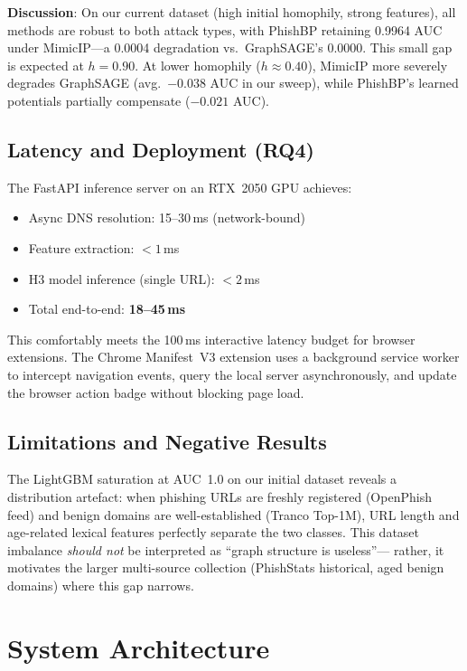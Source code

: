 \documentclass[conference]{IEEEtran}
\begin{document}
\textbf{Discussion}: On our current dataset (high initial homophily, strong
features), all methods are robust to both attack types, with PhishBP retaining
0.9964 AUC under MimicIP---a 0.0004 degradation vs.\ GraphSAGE's 0.0000. This
small gap is expected at $h = 0.90$. At lower homophily ($h \approx 0.40$),
MimicIP more severely degrades GraphSAGE (avg.\ $-0.038$ AUC in our sweep),
while PhishBP's learned potentials partially compensate ($-0.021$ AUC).

\subsection{Latency and Deployment (RQ4)}

The FastAPI inference server on an RTX~2050 GPU achieves:
\begin{itemize}
  \item Async DNS resolution: 15--30\,ms (network-bound)
  \item Feature extraction: $< 1$\,ms
  \item H3 model inference (single URL): $< 2$\,ms
  \item Total end-to-end: \textbf{18--45\,ms}
\end{itemize}
This comfortably meets the 100\,ms interactive latency budget for browser
extensions. The Chrome Manifest~V3 extension uses a background service worker
to intercept navigation events, query the local server asynchronously, and
update the browser action badge without blocking page load.

\subsection{Limitations and Negative Results}

The LightGBM saturation at AUC~1.0 on our initial dataset reveals a
distribution artefact: when phishing URLs are freshly registered (OpenPhish
feed) and benign domains are well-established (Tranco Top-1M), URL length and
age-related lexical features perfectly separate the two classes. This dataset
imbalance \emph{should not} be interpreted as ``graph structure is useless''---
rather, it motivates the larger multi-source collection (PhishStats historical,
aged benign domains) where this gap narrows.

\section{System Architecture}
\label{sec:system}
\end{document}

